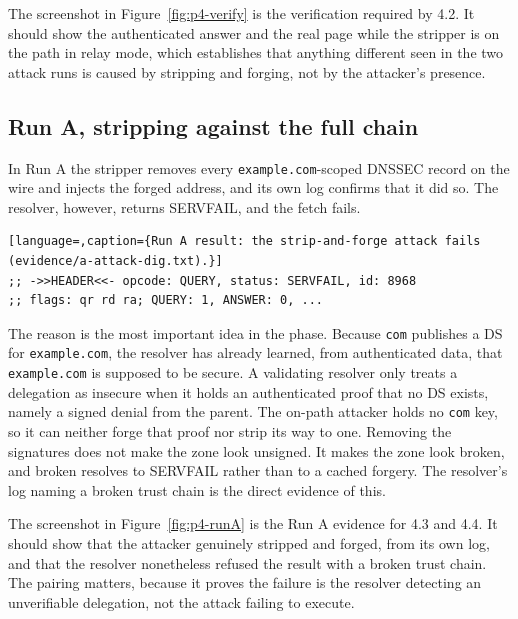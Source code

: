 \documentclass[11pt]{article}
\begin{document}
The screenshot in Figure~\ref{fig:p4-verify} is the verification required by 4.2.
It should show the authenticated answer and the real page while the stripper is on
the path in relay mode, which establishes that anything different seen in the two
attack runs is caused by stripping and forging, not by the attacker's presence.

\subsection{Run A, stripping against the full chain}

In Run A the stripper removes every \texttt{example.com}-scoped DNSSEC record on
the wire and injects the forged address, and its own log confirms that it did so.
The resolver, however, returns SERVFAIL, and the fetch fails.

\begin{lstlisting}[language=,caption={Run A result: the strip-and-forge attack fails (evidence/a-attack-dig.txt).}]
;; ->>HEADER<<- opcode: QUERY, status: SERVFAIL, id: 8968
;; flags: qr rd ra; QUERY: 1, ANSWER: 0, ...
\end{lstlisting}

The reason is the most important idea in the phase. Because \texttt{com} publishes
a DS for \texttt{example.com}, the resolver has already learned, from authenticated
data, that \texttt{example.com} is supposed to be secure. A validating resolver
only treats a delegation as insecure when it holds an authenticated proof that no
DS exists, namely a signed denial from the parent. The on-path attacker holds no
\texttt{com} key, so it can neither forge that proof nor strip its way to one.
Removing the signatures does not make the zone look unsigned. It makes the zone
look broken, and broken resolves to SERVFAIL rather than to a cached forgery. The
resolver's log naming a broken trust chain is the direct evidence of this.


The screenshot in Figure~\ref{fig:p4-runA} is the Run A evidence for 4.3 and 4.4.
It should show that the attacker genuinely stripped and forged, from its own log,
and that the resolver nonetheless refused the result with a broken trust chain.
The pairing matters, because it proves the failure is the resolver detecting an
unverifiable delegation, not the attack failing to execute.
\end{document}
